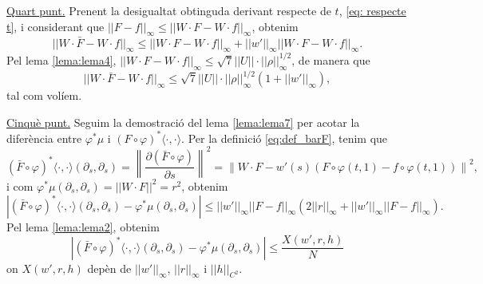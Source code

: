 {\underline{Quart punt.}
Prenent la desigualtat obtinguda derivant respecte de $t$, \ref{eq: respecte t}, i considerant que $||F-f||_\infty\le||W\cdot F - W\cdot f||_\infty$, obtenim
\begin{equation*}
    ||W\cdot\bar F - W\cdot f||_\infty\le ||W\cdot F - W\cdot f||_\infty + ||w'||_\infty||W\cdot F - W\cdot f||_\infty.
\end{equation*}
Pel lema \ref{lema:lema4}, $||W\cdot F - W\cdot f||_\infty\le\sqrt7||U||\cdot||\rho||^{1/2}_\infty$, de manera que
\begin{equation*}
    ||W\cdot\bar F - W\cdot f||_\infty\le\sqrt7||U||\cdot||\rho||^{1/2}_\infty(1+||w'||_\infty),
\end{equation*}
tal com volíem.

\underline{Cinquè punt.} 
Seguim la demostració del lema \ref{lema:lema7} per acotar la diferència entre $\varphi^*\mu$ i $(F\circ\varphi)^*\langle\cdot,\cdot\rangle$. Per la definició \ref{eq:def_barF}, tenim que
\begin{equation*}
    (\bar F\circ\varphi)^*\langle\cdot,\cdot\rangle (\partial_s, \partial_s) = \left\|\frac{\partial(\bar F\circ\varphi)}{\partial s}\right\|^2 = \left\| W\cdot F - w'(s)(F\circ\varphi(t,1)-f\circ\varphi(t,1)) \right\|^2,
\end{equation*}
i com $\varphi^*\mu(\partial_s,\partial_s) = ||W\cdot F||^2 = r^2$, obtenim
\begin{equation*}
    |(\bar F\circ\varphi)^*\langle\cdot,\cdot\rangle(\partial_s, \partial_s) - \varphi^*\mu(\partial_s, \partial_s)| \le ||w'||_\infty||F-f||_\infty(2||r||_\infty + ||w'||_\infty||F-f||_\infty).
\end{equation*}
Pel lema \ref{lema:lema2}, obtenim
\begin{equation}\label{eq:X}
    |(\bar F\circ\varphi)^*\langle\cdot,\cdot\rangle(\partial_s, \partial_s) - \varphi^*\mu(\partial_s, \partial_s)| \le \frac{X(w',r,h)}{N}
\end{equation}
on $X(w',r,h)$ depèn de $||w'||_\infty$, $||r||_\infty$ i $||h||_{C^2}$.

}
